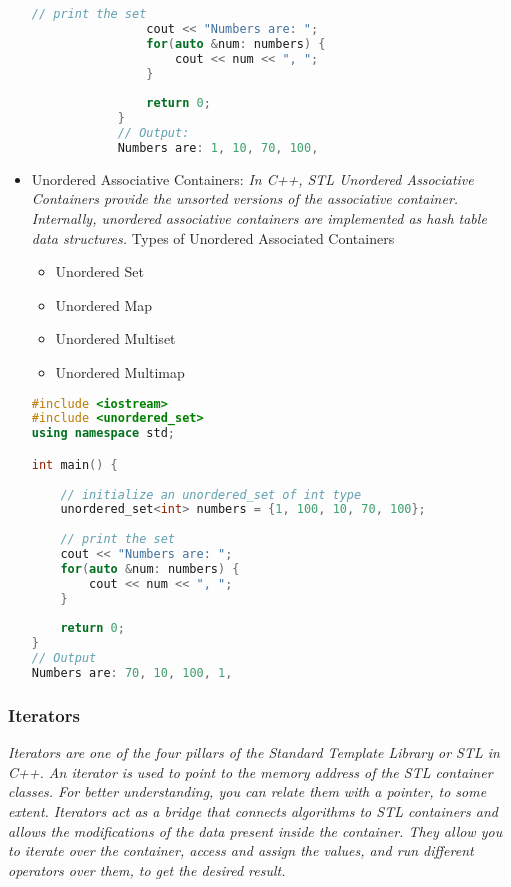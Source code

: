 \documentclass[11pt]{article}
\begin{document}
\begin{itemize}
\begin{lstlisting}[language= C++]
				// print the set
				cout << "Numbers are: ";
				for(auto &num: numbers) {
					cout << num << ", ";
				}
				
				return 0;
			}			
			// Output: 
			Numbers are: 1, 10, 70, 100,
		  \end{lstlisting}
	\item Unordered Associative Containers: \textit{In C++, STL Unordered Associative Containers provide the unsorted versions of the associative container. Internally, unordered associative containers are implemented as hash table data structures.}
	      Types of Unordered Associated Containers
	      \begin{itemize}
		      \item Unordered Set
		      \item Unordered Map
		      \item Unordered Multiset
		      \item Unordered Multimap
	      \end{itemize}

	      \begin{lstlisting}[language=C++]
#include <iostream>
#include <unordered_set>
using namespace std;

int main() {
	
	// initialize an unordered_set of int type
	unordered_set<int> numbers = {1, 100, 10, 70, 100};
	
	// print the set
	cout << "Numbers are: ";
	for(auto &num: numbers) {
		cout << num << ", ";
	}
	
	return 0;
}
// Output
Numbers are: 70, 10, 100, 1,
	\end{lstlisting}
\end{itemize}


\subsubsection{Iterators}
\textit{Iterators are one of the four pillars of the Standard Template Library or STL in C++. An iterator is used to point to the memory address of the STL container classes. For better understanding, you can relate them with a pointer, to some extent.
	Iterators act as a bridge that connects algorithms to STL containers and allows the modifications of the data present inside the container. They allow you to iterate over the container, access and assign the values, and run different operators over them, to get the desired result.}\\
\end{document}

